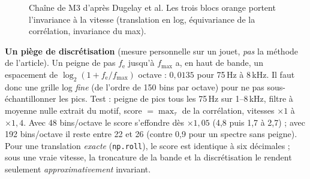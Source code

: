 \documentclass[10pt,a4paper]{article}
\begin{document}
\begin{figure}[ht]
\centering
{}
\caption{Chaîne de M3 d'après Dugelay et al. Les trois blocs orange portent l'invariance à la vitesse (translation en log, équivariance de la corrélation, invariance du max).}\label{fig:m3}
\end{figure}

\textbf{Un piège de discrétisation} (mesure personnelle sur un jouet, \emph{pas} la méthode de l'article). Un peigne de pas $f_{\mathrm e}$ jusqu'à $f_{\max}$ a, en haut de bande, un espacement de $\log_2(1+f_{\mathrm e}/f_{\max})$ octave : $0{,}0135$ pour 75\,Hz à 8\,kHz. Il faut donc une grille log \emph{fine} (de l'ordre de 150 bins par octave) pour ne pas sous-échantillonner les pics. Test : peigne de pics tous les 75\,Hz sur 1--8\,kHz, filtre à moyenne nulle extrait du motif, score $=\max_\tau$ de la corrélation, vitesses $\times1$ à $\times1{,}4$. Avec 48 bins/octave le score s'effondre dès $\times1{,}05$ (4,8 puis 1,7 à 2,7) ; avec 192 bins/octave il reste entre 22 et 26 (contre 0,9 pour un spectre sans peigne). Pour une translation \emph{exacte} (\texttt{np.roll}), le score est identique à six décimales ; sous une vraie vitesse, la troncature de la bande et la discrétisation le rendent seulement \emph{approximativement} invariant.
\end{document}
